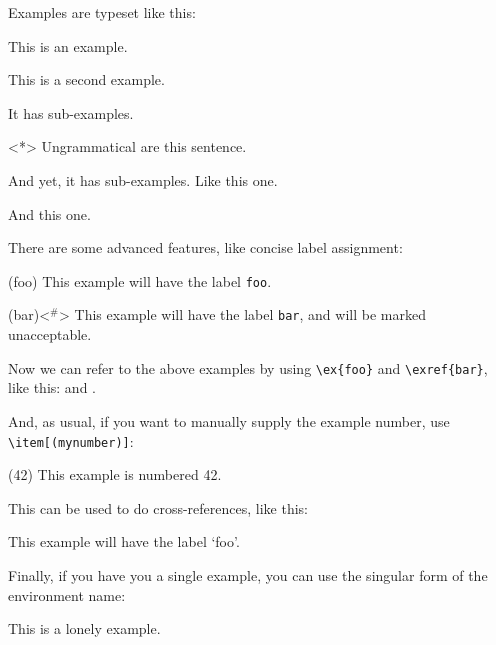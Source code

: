 \documentclass{article}
\begin{document}
%
\noindent Examples are typeset like this:
    \begin{examples}
        \item This is an example.
        \item This is a second example.
              \begin{examples}
                  \item It has sub-examples.
                  \item<*> Ungrammatical are this sentence.
                        \begin{examples}
                            \item And yet, it has sub-examples. Like this one.
                            \item And this one.
                        \end{examples}
              \end{examples}
    \end{examples}
There are some advanced features, like concise label assignment:
\begin{examples}
   \item \begin{examples}
        \item(foo) This example will have the label \verb|foo|.
        \item(bar)<$^{\#}$> This example will have the label \verb|bar|, and will be marked 
                unacceptable.
    \end{examples} 
    
\end{examples}
%
Now we can refer to the above examples by using \verb|\ex{foo}| and \verb|\exref{bar}|, like this:  and .

And, as usual, if you want to manually supply the example number, use \verb|\item[(mynumber)]|:
\begin{examples}
    \item[(42)] This example is numbered 42.
\end{examples}

This can be used to do cross-references, like this:
\begin{examples}
    \item[\ex{foo}] This example will have the label `foo'.
\end{examples}
%
%
Finally, if you have you a single example, you can use the singular form of the environment name:
\begin{example}
    \item This is a lonely example.
\end{example}
\end{document}
